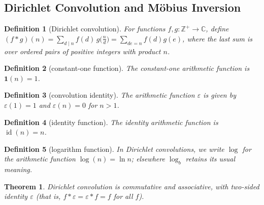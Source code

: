 \documentclass[11pt]{article}
\theoremstyle{ntstyle}
\newtheorem{theorem}{Theorem}[subsection]
\newtheorem{definition}{Definition}[subsection]
\DeclareMathOperator{\id}{id}
\begin{document}
\subsection{Dirichlet Convolution and Möbius Inversion}

\begin{definition}[Dirichlet convolution]\label{def:5.3.1}\label{def:dirichlet-convolution}
  For
  functions $f,g:\mathbb{Z}^+\to\mathbb{C}$, define
  $(f*g)(n) = \sum_{d \mid n} f(d)\, g\big(\tfrac{n}{d}\big) = \sum_{de = n} f(d) g(e)$, where the last sum is over
  ordered pairs of positive
  integers with product $n$.

\end{definition}

\begin{definition}[constant-one function]\label{def:5.3.2}\label{def:constant-one-function}
  The constant-one arithmetic function is $\mathbf{1}(n)=1$.

\end{definition}

\begin{definition}[convolution identity]\label{def:5.3.3}\label{def:convolution-identity}
  The arithmetic function $\varepsilon$ is given by
  $\varepsilon(1)=1$ and $\varepsilon(n)=0$ for $n>1$.

\end{definition}

\begin{definition}[identity function]\label{def:5.3.4}\label{def:identity-function}
  The identity arithmetic function is $\id(n)=n$.

\end{definition}

\begin{definition}[logarithm function]\label{def:5.3.5}\label{def:logarithm-function}
  In Dirichlet convolutions, we write $\log$ for the arithmetic function
  $\log(n)=\ln n$; elsewhere $\log_b$ retains its usual meaning.

\end{definition}

\begin{theorem}\label{thm:5.3.1}
  Dirichlet convolution is commutative and associative, with two-sided
  identity $\varepsilon$ (that is, $f*\varepsilon=\varepsilon*f=f$ for
  all $f$).

\end{theorem}
\end{document}
